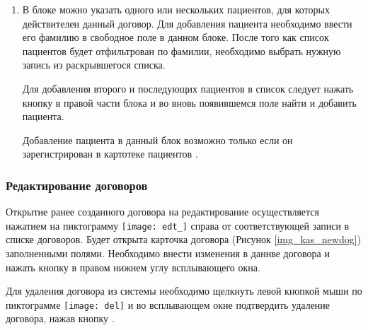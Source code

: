 \begin{enumerate}
 \item В блоке  можно указать одного или нескольких пациентов, для которых действителен данный договор. Для добавления пациента необходимо ввести его фамилию в свободное поле в данном блоке. После того как список пациентов будет отфильтрован по фамилии, необходимо выбрать нужную запись из раскрывшегося списка.
 
 Для добавления второго и последующих пациентов в список следует нажать кнопку  в правой части блока и во вновь появившемся поле найти и добавить пациента.
 
 Добавление пациента в данный блок возможно только если он зарегистрирован в картотеке пациентов \tmisr.
\end{enumerate}

\subsubsection{Редактирование договоров}

Открытие ранее созданного договора на редактирование осуществляется нажатием на пиктограмму \texttt{[image: edt\_]} справа от соответствующей записи в списке договоров. Будет открыта карточка договора (Рисунок \ref{img_kas_newdog}) заполненными полями. Необходимо внести изменения в даннве договора и нажать кнопку  в правом нижнем углу всплывающего окна.

Для удаления договора из системы необходимо щелкнуть левой кнопкой мыши по пиктограмме \texttt{[image: del]} и во всплывающем окне подтвердить удаление договора, нажав кнопку . 

